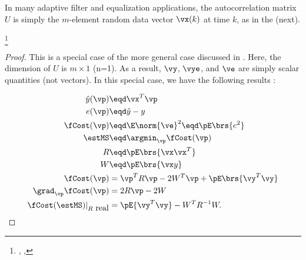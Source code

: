 In many adaptive filter and equalization applications,
the autocorrelation matrix $U$ is simply the $m$-element
random data vector $\vx(k)$ at time $k$, as in the  (next).
\begin{corollary}
\footnote{
  ,
  ,   %
  }
\end{corollary}
\begin{proof}
This is a special case of the more general case discussed
in .
Here, the dimension of $U$ is $m\times1$ (n=1).
As a result,
$\vy$, $\vye$, and $\ve$ are simply scalar quantities (not vectors).
In this special case, we have the following results
:

\begin{align*}
   \hat{y}(\vp)   &\eqd \vx^T \vp    \\
   e(\vp)    &\eqd \hat{y}-y \\
   \fCost(\vp) &\eqd \E\norm{\ve}^2 \eqd \pE\brs{e^2} \\
   \estMS      &\eqd \argmin_\vp \fCost(\vp)  \\
   R           &\eqd \pE\brs{\vx\vx^T}   \\
   W           &\eqd \pE\brs{ \vx y }    \\
    \fCost(\vp)                     &= \vp^T R \vp -2W^T\vp  + \pE\brs{\vy^T\vy} \\
    \grad_\vp \fCost(\vp)           &= 2R\vp - 2W  \\
    \fCost(\estMS)|_{R\mbox{ real}} &=    \pE{\vy^T\vy} - W^T R^{-1}W.
\end{align*}
\end{proof}

